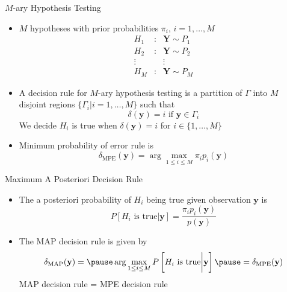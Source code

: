 \documentclass[t]{beamer}
\begin{document}
\begin{frame}{$M$-ary Hypothesis Testing}
  \footnotesize
  \begin{itemize}
    \item $M$ hypotheses with prior probabilities $\pi_i$, $i=1,\ldots,M$
      \begin{equation*}
        \begin{array}{ccc}
            H_1 & : & \mathbf{Y} \sim P_1 \\
            H_2 & : & \mathbf{Y} \sim P_2 \\
            \vdots &   &  \vdots          \\
            H_M & : & \mathbf{Y} \sim P_M   
        \end{array}
      \end{equation*}
    \item \pause A decision rule for $M$-ary hypothesis testing is a partition of $\Gamma$ into $M$ disjoint regions $\{\Gamma_i | i=1,\ldots,M\}$ such that
    \begin{equation*}
      \delta(\mathbf{y}) = i  \text{ if } \mathbf{y} \in \Gamma_i 
    \end{equation*}
    We decide $H_i$ is true when $\delta(\mathbf{y}) = i$ for $i\in\{1,\ldots,M\}$
    \item \pause Minimum probability of error rule is
    \begin{equation*}
      \delta_{\text{MPE}}(\mathbf{y}) = \arg\max_{1\leq i \leq M} \pi_i p_i(\mathbf{y})
    \end{equation*}
  \end{itemize}
  \normalsize
\end{frame}

\begin{frame}{Maximum A Posteriori Decision Rule}
  \footnotesize
  \begin{itemize}
    \item The a posteriori probability of $H_i$ being true given observation $\mathbf{y}$ is
      \begin{equation*}
        P\left[H_i \text{ is true}\bigg|\mathbf{y}\right] = \frac{\pi_i p_i(\mathbf{y})}{p(\mathbf{y})}
      \end{equation*}
    \item \pause The MAP decision rule is given by
    \begin{equation*}
      \delta_{\text{MAP}}(\mathbf{y}) = \pause \arg\max_{1\leq i \leq M} P\left[H_i \text{ is true}\bigg|\mathbf{y}\right] \pause = \delta_{\text{MPE}}(\mathbf{y})
    \end{equation*}
    \pause
    \centering
    \alert{MAP decision rule = MPE decision rule}
  \end{itemize}
  \normalsize
\end{frame}
\end{document}
